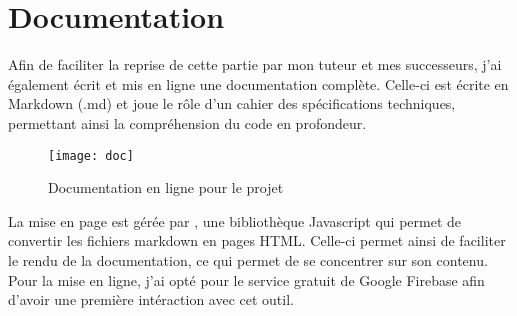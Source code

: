 \section{Documentation}
\vspace{1cm}

Afin de faciliter la reprise de cette partie par mon tuteur et mes successeurs, j’ai également écrit et mis en ligne une documentation complète. Celle-ci est écrite en Markdown (.md) et joue le rôle d’un cahier des spécifications techniques, permettant ainsi la compréhension du code en profondeur. 

\begin{figure}[!h]
    \centering
    \texttt{[image: doc]}
    \caption{Documentation en ligne pour le projet}
\end{figure}

La mise en page est gérée par , une bibliothèque Javascript qui permet de convertir les fichiers markdown en pages HTML. Celle-ci permet ainsi de faciliter le rendu de la documentation, ce qui permet de se concentrer sur son contenu.\\

Pour la mise en ligne, j’ai opté pour le service gratuit de Google Firebase afin d’avoir une première intéraction avec cet outil.